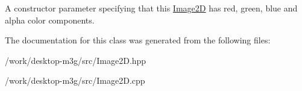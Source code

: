 A constructor parameter specifying that this \hyperlink{classm3g_1_1Image2D}{Image2D} has red, green, blue and alpha color components. 

The documentation for this class was generated from the following files:\begin{CompactItemize}
\item 
/work/desktop-m3g/src/Image2D.hpp\item 
/work/desktop-m3g/src/Image2D.cpp\end{CompactItemize}
